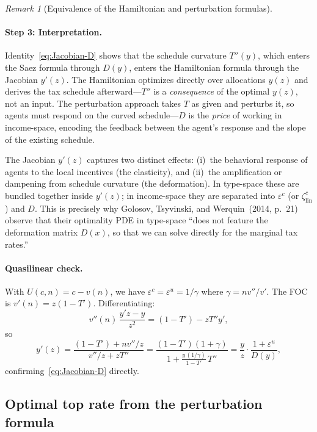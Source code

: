 \documentclass[12pt,a4paper]{article}
\theoremstyle{definition}
\theoremstyle{plain}
\theoremstyle{remark}
\newtheorem{remark}{Remark}[section]
\begin{document}
\begin{remark}[Equivalence of the Hamiltonian and perturbation formulas]
  \paragraph{Step 3: Interpretation.}
  Identity~\eqref{eq:Jacobian-D} shows that the schedule curvature $T''(y)$, which enters the Saez formula through $D(y)$, enters the Hamiltonian formula through the Jacobian $y'(z)$. The Hamiltonian optimizes directly over allocations $y(z)$ and derives the tax schedule afterward---$T''$ is a \emph{consequence} of the optimal $y(z)$, not an input. The perturbation approach takes $T$ as given and perturbs it, so agents must respond on the curved schedule---$D$ is the \emph{price} of working in income-space, encoding the feedback between the agent's response and the slope of the existing schedule.
  
  The Jacobian $y'(z)$ captures two distinct effects: (i)~the behavioral response of agents to the local incentives (the elasticity), and (ii)~the amplification or dampening from schedule curvature (the deformation). In type-space these are bundled together inside $y'(z)$; in income-space they are separated into $\varepsilon^c$ (or $\zeta^c_{\mathrm{lin}}$) and $D$. This is precisely why Golosov, Tsyvinski, and Werquin~(2014, p.~21) observe that their optimality PDE in type-space ``does not feature the deformation matrix $D(x)$, so that we can solve directly for the marginal tax rates.''
  
  \paragraph{Quasilinear check.}
  With $U(c,n) = c - v(n)$, we have $\varepsilon^c = \varepsilon^u = 1/\gamma$ where $\gamma = nv''/v'$. The FOC is $v'(n) = z(1-T')$. Differentiating:
  \[
    v''(n)\,\frac{y'z - y}{z^2} = (1-T') - zT''y',
  \]
  so
  \[
    y'(z) = \frac{(1-T') + nv''/z}{v''/z + zT''} = \frac{(1-T')(1+\gamma)}{1 + \frac{y\,(1/\gamma)}{1-T'}\,T''} = \frac{y}{z}\cdot\frac{1+\varepsilon^u}{D(y)},
  \]
  confirming~\eqref{eq:Jacobian-D} directly.
  \end{remark}
  
  \subsection{Optimal top rate from the perturbation formula}
\label{sec:top-rate-pert}
\end{document}

